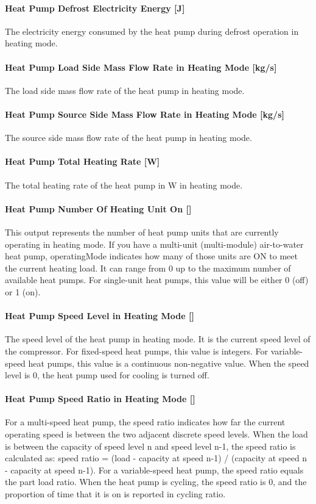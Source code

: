 \paragraph{Heat Pump Defrost Electricity Energy {[}J{]}} The electricity energy
consumed by the heat pump during defrost operation in heating mode.
\paragraph{Heat Pump Load Side Mass Flow Rate in Heating Mode {[}kg/s{]}} The
load side mass flow rate of the heat pump in heating mode.
\paragraph{Heat Pump Source Side Mass Flow Rate in Heating Mode {[}kg/s{]}} The
source side mass flow rate of the heat pump in heating mode.
\paragraph{Heat Pump Total Heating Rate {[}W{]}} The total heating rate of the
heat pump in W in heating mode.
\paragraph{Heat Pump Number Of Heating Unit On {[}{]}}
This output represents the number of heat pump units that are currently operating
in heating mode. If you have a multi-unit (multi-module) air-to-water heat pump,
operatingMode indicates how many of those units are ON to meet the current heating load.
It can range from 0 up to the maximum number of available heat pumps. For single-unit heat pumps,
this value will be either 0 (off) or 1 (on).
\paragraph{Heat Pump Speed Level in Heating Mode {[}{]}} The speed level of the
heat pump in heating mode. It is the current speed level of the compressor. For
fixed-speed heat pumps, this value is integers. For variable-speed heat pumps,
this value is a continuous non-negative value. When the speed level is 0,
the heat pump used for cooling is turned off.
\paragraph{Heat Pump Speed Ratio in Heating Mode {[}{]}} For a multi-speed heat pump, the speed ratio
indicates how far the current operating speed is between the two adjacent discrete speed levels.
When the load is between the capacity of speed level n and speed level n-1, the speed ratio is calculated as:
speed ratio = (load - capacity at speed n-1) / (capacity at speed n - capacity at speed n-1).
For a variable-speed heat pump, the speed ratio equals the part load ratio.
When the heat pump is cycling, the speed ratio is 0, and the proportion of time that it is on is reported in cycling ratio.
